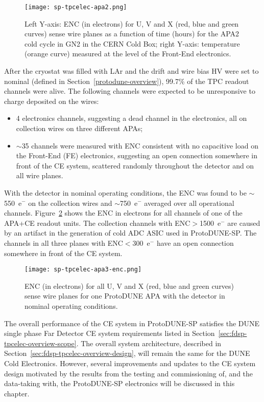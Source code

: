 \begin{figure}
    \centering
    \texttt{[image: sp-tpcelec-apa2.png]}
    \caption{Left Y-axis: ENC (in electrons) for U, V and X (red, blue and green curves) sense wire planes as a function of time (hours) for the APA2 cold cycle in GN2 in the CERN Cold Box; right Y-axis: temperature (orange curve) measured at the level of the Front-End electronics.}
    \label{fig:apa2-cycle}
\end{figure}

After the cryostat was filled with LAr and the drift and wire bias HV were set to nominal (defined in Section~\ref{protodune-overview}), 99.7\% of the TPC readout channels were alive. The following channels were expected to be unresponsive to charge deposited on the wires:
\begin{itemize}
    \item 4 electronics channels, suggesting a dead channel in the electronics, all on collection wires on three different APAs;
    \item $\sim$35 channels were measured with ENC consistent with no capacitive load on the Front-End (FE) electronics, suggesting an open connection somewhere in front of the CE system, scattered randomly throughout the detector and on all wire planes.
\end{itemize}
With the detector in nominal operating conditions, the ENC was found to be $\sim$550~e$^-$ on the collection wires and $\sim$750~e$^-$ averaged over all operational channels. Figure~\ref{fig:apa3-noise} shows the ENC in electrons for all channels of one of the APA+CE readout units. The collection channels with ENC$>$1500~e$^-$ are caused by an artifact in the generation of cold ADC ASIC used in ProtoDUNE-SP. The channels in all three planes with ENC$<$300~e$^-$ have an open connection somewhere in front of the CE system.

\begin{figure}
    \centering
    \texttt{[image: sp-tpcelec-apa3-enc.png]}
    \caption{ENC (in electrons) for all U, V and X (red, blue and green curves) sense wire planes for one ProtoDUNE APA with the detector in nominal operating conditions.}
    \label{fig:apa3-noise}
\end{figure}

The overall performance of the CE system in ProtoDUNE-SP satisfies the DUNE single phase Far Detector CE system requirements listed in Section~\ref{sec:fdsp-tpcelec-overview-scope}. The overall system architecture, described in Section~\ref{sec:fdsp-tpcelec-overview-design}, will remain the same for the DUNE Cold Electronics. However, several improvements and updates to the CE system design motivated by the results from the testing and commissioning of, and the data-taking with, the ProtoDUNE-SP electronics will be discussed in this chapter.
